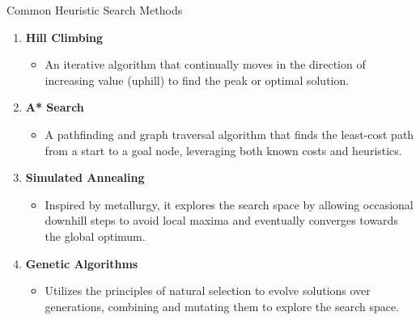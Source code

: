 \documentclass[aspectratio=169]{beamer}
\begin{document}
\begin{frame}[fragile]{Common Heuristic Search Methods}
    \begin{enumerate}
        \item \textbf{Hill Climbing} 
            \begin{itemize}
                \item An iterative algorithm that continually moves in the direction of increasing value (uphill) to find the peak or optimal solution.
            \end{itemize}
        \item \textbf{A* Search}
            \begin{itemize}
                \item A pathfinding and graph traversal algorithm that finds the least-cost path from a start to a goal node, leveraging both known costs and heuristics.
            \end{itemize}
        \item \textbf{Simulated Annealing}
            \begin{itemize}
                \item Inspired by metallurgy, it explores the search space by allowing occasional downhill steps to avoid local maxima and eventually converges towards the global optimum.
            \end{itemize}
        \item \textbf{Genetic Algorithms}
            \begin{itemize}
                \item Utilizes the principles of natural selection to evolve solutions over generations, combining and mutating them to explore the search space.
            \end{itemize}
    \end{enumerate}
\end{frame}
\end{document}
